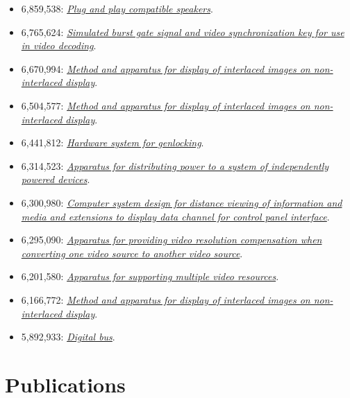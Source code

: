 \documentclass[10pt,letterpaper,oneside]{report}
\begin{document}
\begin{itemize}
  \item 6,859,538: \href{http://voltz.us/resume/6859538.pdf}
    {\textit{Plug and play compatible speakers}}.

  \item 6,765,624: \href{http://voltz.us/resume/6765624.pdf}
    {\textit{Simulated burst gate signal and video synchronization key for use
    in video decoding}}.

  \item 6,670,994: \href{http://voltz.us/resume/6670994.pdf}
    {\textit{Method and apparatus for display of interlaced images on
    non-interlaced display}}.

  \item 6,504,577: \href{http://voltz.us/resume/6504577.pdf}
    {\textit{Method and apparatus for display of interlaced images on
    non-interlaced display}}.

  \item 6,441,812: \href{http://voltz.us/resume/6441812.pdf}
    {\textit{Hardware system for genlocking}}.

  \item 6,314,523: \href{http://voltz.us/resume/6314523.pdf}
    {\textit{Apparatus for distributing power to a system of independently
    powered devices}}.

  \item 6,300,980: \href{http://voltz.us/resume/6300980.pdf}
    {\textit{Computer system design for distance viewing of information and
    media and extensions to display data channel for control panel interface}}.

  \item 6,295,090: \href{http://voltz.us/resume/6295090.pdf}
    {\textit{Apparatus for providing video resolution compensation when
    converting one video source to another video source}}.

  \item 6,201,580: \href{http://voltz.us/resume/6201580.pdf}
    {\textit{Apparatus for supporting multiple video resources}}.

  \item 6,166,772: \href{http://voltz.us/resume/6166772.pdf}
    {\textit{Method and apparatus for display of interlaced images on
    non-interlaced display}}.

  \item 5,892,933: \href{http://voltz.us/resume/5892933.pdf}
    {\textit{Digital bus}}.
\end{itemize}

\section{Publications}
\end{document}
